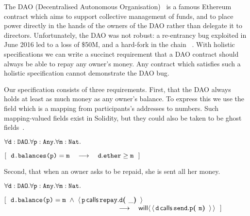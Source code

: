 The DAO  {(Decentralised Autonomous Organisation)}~\cite{Dao}  is a famous Ethereum contract  which aims to support
collective management of funds,  and to place power directly in the
hands of the owners of the DAO
rather than delegate it to directors.
Unfortunately, the DAO was not robust:
a re-entrancy bug   exploited in June 2016 led  to a loss of   \$50M, and
a hard-fork in the  chain ~\cite{DaoBug}.
%
With holistic specifications  we can  write a succinct requirement that a
DAO contract should always be able to repay any owner's money.
Any contract which satisfies such a holistic specification cannot demonstrate the DAO bug.
 
Our specification consists of three requirements.
First, that the DAO always holds at least as 
much money as any owner's balance.
To express this we use 
the field  which is a mapping from participants's addresses to 
numbers. Such mapping-valued fields exist in Solidity, but they could
also be taken to be ghost fields~\cite{ghost}.
  
\vspace{.1cm}

\noindent
 \strut \hspace{0.5cm} $\forall \prg{d}:\prg{DAO}.\forall \prg{p}:\prg{Any}.\forall\prg{m}:\prg{Nat}.$\\
\strut \hspace{0.5cm} $[\ \ \prg{d.balances(p)}=\prg{m}  \ \ \  \longrightarrow  \ \ \ \prg{d}.\prg{ether}\geq \prg{m} \ \ ] $

\noindent
Second, that when an owner asks to be repaid, she is sent all her money.
\vspace{.1cm}

\noindent
 \strut \hspace{0.5cm} $\forall \prg{d}:\prg{DAO}.\forall \prg{p}:\prg{Any}.\forall\prg{m}:\prg{Nat}.$\\
\strut \hspace{0.5cm} $[\ \ \prg{d.balance(p)}=\prg{m}
 \ \wedge \ \Calls{\prg{p}}{\prg{d}}{\prg{repay}}{\_}  $\\
 $\strut \hspace{5.5cm}   \ \ \  \longrightarrow  \ \ \  \Future{\Calls{\prg{d}}{\prg{p}}{\prg{send}}{\prg{m}}}\ \ ] $  
\vspace{.1cm}

\noindent
{}
 
